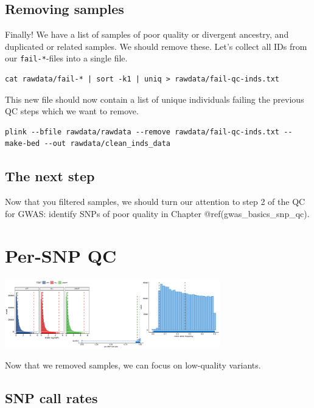 \documentclass[
]{book}
\newcommand{\passthrough}[1]{#1}
\begin{document}
\hypertarget{removing-samples}{%
\section{Removing samples}\label{removing-samples}}

Finally! We have a list of samples of poor quality or divergent ancestry, and duplicated or related samples. We should remove these. Let's collect all IDs from our \passthrough{\lstinline!fail-*!}-files into a single file.

\begin{lstlisting}
cat rawdata/fail-* | sort -k1 | uniq > rawdata/fail-qc-inds.txt
\end{lstlisting}

This new file should now contain a list of unique individuals failing the previous QC steps which we want to remove.

\begin{lstlisting}
plink --bfile rawdata/rawdata --remove rawdata/fail-qc-inds.txt --make-bed --out rawdata/clean_inds_data
\end{lstlisting}

\hypertarget{the-next-step}{%
\section{The next step}\label{the-next-step}}

Now that you filtered samples, we should turn our attention to step 2 of the QC for GWAS: identify SNPs of poor quality in Chapter @ref(gwas\_basics\_snp\_qc).

\hypertarget{gwas_basics_snp_qc}{%
\chapter{Per-SNP QC}\label{gwas_basics_snp_qc}}

\includegraphics[width=0.7\textwidth,height=\textheight]{img/gwas_snp_qc.png}

Now that we removed samples, we can focus on low-quality variants.

\hypertarget{snp-call-rates}{%
\section{SNP call rates}\label{snp-call-rates}}
\end{document}
